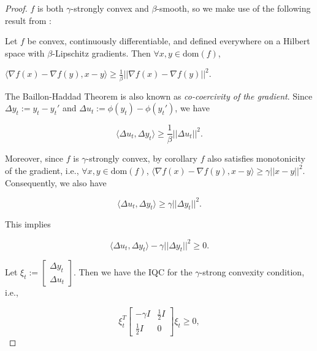 \documentclass[twoside,11pt]{article}
\begin{document}
\begin{proof}
$f$ is both $\gamma$-strongly convex and $\beta$-smooth, so we make use of the following result from \cite{BH77}:

\begin{lemma}
Let $f$ be convex, continuously differentiable, and defined everywhere on a Hilbert space with $\beta$-Lipschitz gradients. Then $\forall x,y \in \text{dom}(f)$,

\begin{center}
$\langle \nabla f(x) - \nabla f(y), x-y \rangle \geq \frac{1}{\beta}||\nabla f(x) - \nabla f(y)||^2$.
\end{center}
\end{lemma}

\noindent
The Baillon-Haddad Theorem is also known as \textit{co-coercivity of the gradient}. Since $\Delta y_t := y_t-y_t'$ and $\Delta u_t := \phi(y_t)-\phi(y_t')$, we have

\begin{equation}
\langle \Delta u_t, \Delta y_t \rangle \geq \frac{1}{\beta}||\Delta u_t||^2.
\end{equation}

\noindent
Moreover, since $f$ is $\gamma$-strongly convex, by corollary $f$ also satisfies monotonicity of the gradient, i.e., $\forall x,y \in \text{dom}(f)$, $\langle \nabla f(x) - \nabla f(y), x-y\rangle \geq \gamma||x-y||^2$. Consequently, we also have

\begin{equation}
\langle \Delta u_t, \Delta y_t\rangle \geq \gamma||\Delta y_t||^2.
\end{equation}

\noindent
This implies 

\begin{equation}
\langle \Delta u_t, \Delta y_t \rangle - \gamma ||\Delta y_t||^2 \geq 0.
\end{equation}

\noindent
Let $\xi_t := \begin{bmatrix}
    \Delta y_t \\
    \Delta u_t
\end{bmatrix}$. Then we have the IQC for the $\gamma$-strong convexity condition, i.e., 

\begin{equation}
\xi_t^T \begin{bmatrix}
    -\gamma I & \frac{1}{2}I \\
    \frac{1}{2}I & 0
\end{bmatrix}\xi_t \geq 0,
\end{equation}


\end{proof}
\end{document}
